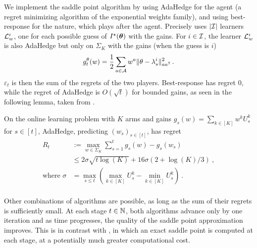 We implement the saddle point algorithm by using AdaHedge for the agent (a regret minimizing algorithm of the exponential weights family), and using best-response for the nature, which plays after the agent. Precisely \LG uses $|\mathcal{I}|$ learners $\mathcal{L}_w^i$, one for each possible guess of $I^\star({\boldsymbol \theta})$ with the gains. For $i\in\mathcal{I}$, the learner $\mathcal{L}_w^i$ is also AdaHedge but only on $\Sigma_K$ with the gains (when the guess is $i$)
\[
    g_t^\theta(w) = \frac{1}{2} \sum_{a\in\mathcal{A}}  w^{a} \Vert \theta - \lambda_s^i \Vert^2_{a a^{\mathsf{\scriptscriptstyle T}}}\,.
\]
$\varepsilon_t$ is then the sum of the regrets of the two players. Best-response has regret 0, while the regret of AdaHedge is $O(\sqrt{t})$ for bounded gains, as seen in the following lemma, taken from \citet{derooij2014hedge}.
\begin{lemma}\label{lem:adahedge}
On the online learning problem with $K$ arms and gains $g_s(w) = \sum_{k\in[K]} w^k  U_s^k$ for $s\in[t]$, AdaHedge, predicting $(w_s)_{s\in[t]}$, has regret
\begin{align*}
R_t&:= \max_{w\in\Sigma_K}\sum_{s=1}^t g_s(w) -g_s(w_s) \\
&\le 2\sigma\sqrt{t\log(K)} + 16\sigma(2+\log(K)/3) \: ,\\
\text{where }
\sigma &= \max_{s\le t}  (\max_{k\in[K]}U_s^{k}- \min_{k\in[K]}U_s^{k}) \:.\\
\end{align*}
\end{lemma}
Other combinations of algorithms are possible, as long as the sum of their regrets is sufficiently small. At each stage $t\in{\mathbb N}$, both algorithms advance only by one iteration and as time progresses, the quality of the saddle point approximation improves. This is in contrast with \Track \cite{garivier2016tracknstop}, in which an exact saddle point is computed at each stage, at a potentially much greater computational cost.

